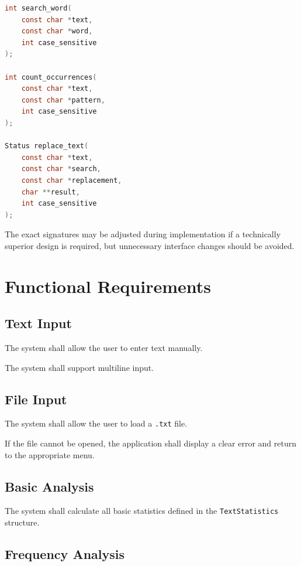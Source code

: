 \documentclass[12pt,a4paper]{article}
\begin{document}
\begin{lstlisting}[language=C]
int search_word(
    const char *text,
    const char *word,
    int case_sensitive
);

int count_occurrences(
    const char *text,
    const char *pattern,
    int case_sensitive
);

Status replace_text(
    const char *text,
    const char *search,
    const char *replacement,
    char **result,
    int case_sensitive
);
\end{lstlisting}

The exact signatures may be adjusted during implementation if a
technically superior design is required, but unnecessary interface
changes should be avoided.


\section{Functional Requirements}

\subsection{Text Input}

The system shall allow the user to enter text manually.

The system shall support multiline input.

\subsection{File Input}

The system shall allow the user to load a \texttt{.txt} file.

If the file cannot be opened, the application shall display a clear
error and return to the appropriate menu.

\subsection{Basic Analysis}

The system shall calculate all basic statistics defined in the
\texttt{TextStatistics} structure.

\subsection{Frequency Analysis}
\end{document}

